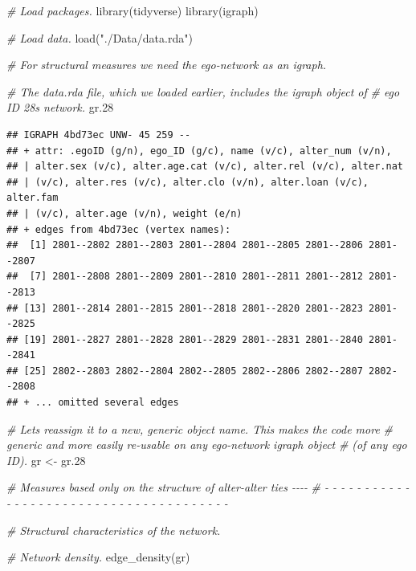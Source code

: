 \documentclass[
]{book}
\newenvironment{Shaded}{\begin{snugshade}}{\end{snugshade}}
\newcommand{\CommentTok}[1]{\textcolor[rgb]{0.56,0.35,0.01}{\textit{#1}}}
\newcommand{\FloatTok}[1]{\textcolor[rgb]{0.00,0.00,0.81}{#1}}
\newcommand{\FunctionTok}[1]{\textcolor[rgb]{0.00,0.00,0.00}{#1}}
\newcommand{\NormalTok}[1]{#1}
\newcommand{\OtherTok}[1]{\textcolor[rgb]{0.56,0.35,0.01}{#1}}
\newcommand{\StringTok}[1]{\textcolor[rgb]{0.31,0.60,0.02}{#1}}
\begin{document}
\begin{Shaded}
\begin{Highlighting}[]
\CommentTok{\# Load packages.}
\FunctionTok{library}\NormalTok{(tidyverse)}
\FunctionTok{library}\NormalTok{(igraph)}

\CommentTok{\# Load data.}
\FunctionTok{load}\NormalTok{(}\StringTok{"./Data/data.rda"}\NormalTok{)}

\CommentTok{\# For structural measures we need the ego{-}network as an igraph.}

\CommentTok{\# The data.rda file, which we loaded earlier, includes the igraph object of}
\CommentTok{\# ego ID 28\textquotesingle{}s network.}
\NormalTok{gr}\FloatTok{.28}
\end{Highlighting}
\end{Shaded}

\begin{verbatim}
## IGRAPH 4bd73ec UNW- 45 259 -- 
## + attr: .egoID (g/n), ego_ID (g/c), name (v/c), alter_num (v/n),
## | alter.sex (v/c), alter.age.cat (v/c), alter.rel (v/c), alter.nat
## | (v/c), alter.res (v/c), alter.clo (v/n), alter.loan (v/c), alter.fam
## | (v/c), alter.age (v/n), weight (e/n)
## + edges from 4bd73ec (vertex names):
##  [1] 2801--2802 2801--2803 2801--2804 2801--2805 2801--2806 2801--2807
##  [7] 2801--2808 2801--2809 2801--2810 2801--2811 2801--2812 2801--2813
## [13] 2801--2814 2801--2815 2801--2818 2801--2820 2801--2823 2801--2825
## [19] 2801--2827 2801--2828 2801--2829 2801--2831 2801--2840 2801--2841
## [25] 2802--2803 2802--2804 2802--2805 2802--2806 2802--2807 2802--2808
## + ... omitted several edges
\end{verbatim}

\begin{Shaded}
\begin{Highlighting}[]
\CommentTok{\# Let\textquotesingle{}s reassign it to a new, generic object name. This makes the code more }
\CommentTok{\# generic and more easily re{-}usable on any ego{-}network igraph object }
\CommentTok{\# (of any ego ID).}
\NormalTok{gr }\OtherTok{\textless{}{-}}\NormalTok{ gr}\FloatTok{.28}

\CommentTok{\# Measures based only on the structure of alter{-}alter ties                  {-}{-}{-}{-}}
\CommentTok{\# {-} {-} {-} {-} {-} {-} {-} {-} {-} {-} {-} {-} {-} {-} {-} {-} {-} {-} {-} {-} {-} {-} {-} {-} {-} {-} {-} {-} {-} {-} {-} {-} {-} {-} {-} {-} {-} {-} {-} }

\CommentTok{\# Structural characteristics of the network.}

\CommentTok{\# Network density.}
\FunctionTok{edge\_density}\NormalTok{(gr)}
\end{Highlighting}
\end{Shaded}
\end{document}
